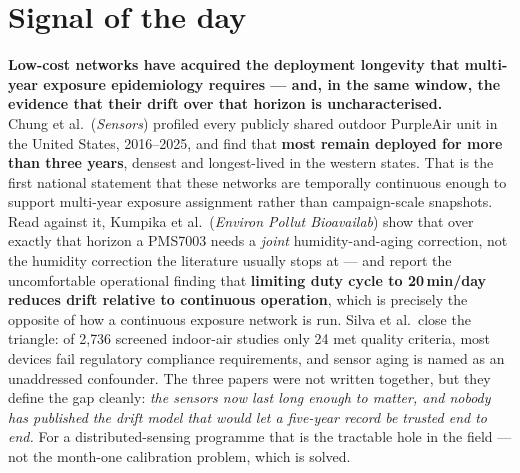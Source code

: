 \documentclass[10pt]{article}
\begin{document}
\vspace{6mm}

\section*{\sffamily\bfseries\color{Deep}Signal of the day}
\vspace{-1.5mm}{\color{Amber}\rule{\linewidth}{1.1pt}}\vspace{2.5mm}

\begin{keybox}
{\sffamily\bfseries\small\color{Deep}Low-cost networks have acquired the deployment
longevity that multi-year exposure epidemiology requires --- and, in the same window, the
evidence that their drift over that horizon is uncharacterised.}\\[1.4mm]
\footnotesize
Chung et al.\ (\textit{Sensors}) profiled every publicly shared outdoor PurpleAir unit in
the United States, 2016--2025, and find that \textbf{most remain deployed for more than
three years}, densest and longest-lived in the western states. That is the first national
statement that these networks are temporally continuous enough to support multi-year
exposure assignment rather than campaign-scale snapshots. Read against it, Kumpika et al.\
(\textit{Environ Pollut Bioavailab}) show that over exactly that horizon a PMS7003 needs a
\emph{joint} humidity-and-aging correction, not the humidity correction the literature
usually stops at --- and report the uncomfortable operational finding that
\textbf{limiting duty cycle to 20\,min/day reduces drift relative to continuous
operation}, which is precisely the opposite of how a continuous exposure network is run.
Silva et al.\ close the triangle: of 2{,}736 screened indoor-air studies only 24 met
quality criteria, most devices fail regulatory compliance requirements, and sensor aging
is named as an unaddressed confounder. The three papers were not written together, but
they define the gap cleanly: \emph{the sensors now last long enough to matter, and nobody
has published the drift model that would let a five-year record be trusted end to end.}
For a distributed-sensing programme that is the tractable hole in the field --- not the
month-one calibration problem, which is solved.
\end{keybox}

\vspace{3mm}

\end{document}
